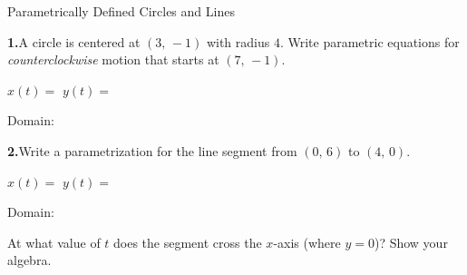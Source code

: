 \documentclass[10pt]{article}
\begin{document}
\namedateperiod

\vspace{0.12in}

\begin{notesbox}{Parametrically Defined Circles and Lines}

\textbf{1.}\quad A circle is centered at $(3,\,-1)$ with radius $4$.
Write parametric equations for \emph{counterclockwise} motion that
starts at $(7,\,-1)$.

\vspace{4pt}
$x(t) = $ \blank{5.5cm} \qquad $y(t) = $ \blank{5.5cm}

\vspace{0.04in}
Domain: \blank{3cm}

\vspace{0.22in}
\textbf{2.}\quad Write a parametrization for the line segment from
$(0,\,6)$ to $(4,\,0)$.

\vspace{4pt}
$x(t) = $ \blank{5.5cm} \qquad $y(t) = $ \blank{5.5cm}

\vspace{0.04in}
Domain: \blank{3cm}

\vspace{0.16in}
At what value of $t$ does the segment cross the $x$-axis (where $y=0$)?
Show your algebra.


\end{notesbox}
\end{document}
